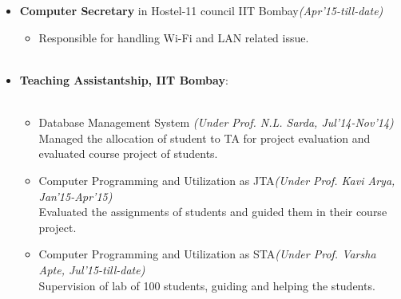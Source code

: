 \\[-1cm]\\
\begin{itemize}
        \item \textbf{Computer Secretary} in Hostel-11 council IIT Bombay\hfill \emph{(Apr'15-till-date)}\hfill \\[-0.7cm]
	\begin{itemize}
		\item Responsible for handling Wi-Fi and LAN related issue. \\[- 1.1cm]\\
	\end{itemize}	
	\item \textbf{Teaching Assistantship, IIT Bombay}: \hfill \\[- 1.1cm]\\
	\begin{itemize}
		\item Database Management System \hfill \emph{(Under Prof. N.L. Sarda, Jul'14-Nov'14)}\\
			Managed the allocation of student to TA for project evaluation and evaluated course project of students.
		\item Computer Programming and Utilization as JTA\hfill \emph{(Under Prof. Kavi Arya, Jan'15-Apr'15)}\\
			Evaluated the assignments of students and guided them in their course project.
		\item Computer Programming and Utilization as STA\hfill \emph{(Under Prof. Varsha Apte, Jul'15-till-date)}\\
			Supervision of lab of 100 students, guiding and helping the students.\\[-0.6cm]
	\end{itemize}
\end{itemize}
